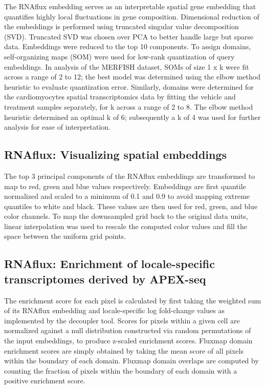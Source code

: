 The RNAflux embedding serves as an interpretable spatial gene embedding that quantifies highly local fluctuations in gene composition. Dimensional reduction of the embeddings is performed using truncated singular value decomposition (SVD). Truncated SVD was chosen over PCA to better handle large but sparse data. Embeddings were reduced to the top 10 components. To assign domains, self-organizing maps (SOM) were used for low-rank quantization of query embeddings. In analysis of the MERFISH dataset, SOMs of size 1 x k were fit across a range of 2 to 12; the best model was determined using the elbow method heuristic to evaluate quantization error. Similarly, domains were determined for the cardiomyocytes spatial transcriptomics data by fitting the vehicle and treatment samples separately, for k across a range of 2 to 8. The elbow method heuristic determined an optimal k of 6; subsequently a k of 4 was used for further analysis for ease of interpretation.

\subsection{RNAflux: Visualizing spatial embeddings}
The top 3 principal components of the RNAflux embeddings are transformed to map to red, green and blue values respectively. Embeddings are first quantile normalized and scaled to a minimum of 0.1 and 0.9 to avoid mapping extreme quantiles to white and black. These values are then used for red, green, and blue color channels. To map the downsampled grid back to the original data units, linear interpolation was used to rescale the computed color values and fill the space between the uniform grid points.

\subsection{RNAflux: Enrichment of locale-specific transcriptomes derived by APEX-seq}
The enrichment score for each pixel is calculated by first taking the weighted sum of its RNAflux embedding and locale-specific log fold-change values as implemented by the decoupler tool\cite{badia-i-mompelDecoupleREnsembleComputational2022}. Scores for pixels within a given cell are normalized against a null distribution constructed via random permutations of the input embeddings, to produce z-scaled enrichment scores. Fluxmap domain enrichment scores are simply obtained by taking the mean score of all pixels within the boundary of each domain. Fluxmap domain overlaps are computed by counting the fraction of pixels within the boundary of each domain with a positive enrichment score. 

